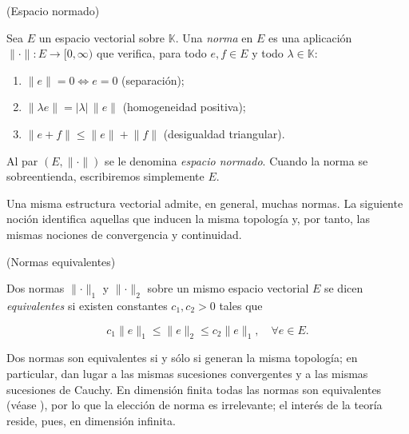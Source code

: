 \begin{Definicion}{(Espacio normado)}
\label{ch:preliminares:def:espacioNormado}

Sea $E$ un espacio vectorial sobre $\mathbb{K}$. Una \textit{norma} en $E$ es una
aplicación $\lVert \cdot \rVert : E \rightarrow [0, \infty)$ que verifica, para
todo $e, f \in E$ y todo $\lambda \in \mathbb{K}$:

\begin{enumerate}
    \item $\lVert e \rVert = 0 \iff e = 0$ (separación);
    \item $\lVert \lambda e \rVert = |\lambda| \, \lVert e \rVert$ (homogeneidad positiva);
    \item $\lVert e + f \rVert \leq \lVert e \rVert + \lVert f \rVert$ (desigualdad triangular).
\end{enumerate}

Al par $(E, \lVert \cdot \rVert)$ se le denomina \textit{espacio normado}. Cuando
la norma se sobreentienda, escribiremos simplemente $E$.
\end{Definicion}

Una misma estructura vectorial admite, en general, muchas normas. La siguiente
noción identifica aquellas que inducen la misma topología y, por tanto, las
mismas nociones de convergencia y continuidad.\\

\begin{Definicion}{(Normas equivalentes)}
\label{ch:preliminares:def:normasEquivalentes}

Dos normas $\lVert \cdot \rVert_1$ y $\lVert \cdot \rVert_2$ sobre un mismo
espacio vectorial $E$ se dicen \textit{equivalentes} si existen constantes
$c_1, c_2 > 0$ tales que

\[c_1 \lVert e \rVert_1 \leq \lVert e \rVert_2 \leq c_2 \lVert e \rVert_1, \quad \forall e \in E.\]
\end{Definicion}

\begin{Observacion}
\label{ch:preliminares:obs:normasEquivalentes}
Dos normas son equivalentes si y sólo si generan la misma topología; en
particular, dan lugar a las mismas sucesiones convergentes y a las mismas
sucesiones de Cauchy. En dimensión finita todas las normas son equivalentes
(véase \cite[Teorema~III.3.1]{conway-1990-cou-fun-ana}), por lo que la elección
de norma es irrelevante; el interés de la teoría reside, pues, en dimensión
infinita.
\end{Observacion}

